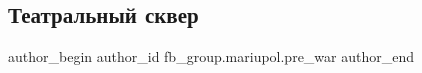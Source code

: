  
 
 
 
 

\subsection{Театральный сквер}
\label{sec:11_02_2023.fb.fb_group.mariupol.pre_war.10.teatralnii_skver}

\ifcmt
 author_begin
   author_id fb_group.mariupol.pre_war
 author_end
\fi
